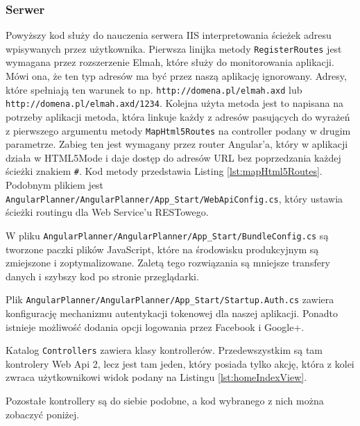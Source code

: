 \documentclass[10pt,titlepage]{article}
\begin{document}
\subsubsection{Serwer}
\lstset{style=sharpc}

\par Powyższy kod służy do nauczenia serwera IIS interpretowania ścieżek adresu wpisywanych przez użytkownika. Pierwsza linijka metody \verb|RegisterRoutes| jest wymagana przez rozszerzenie Elmah, które służy do monitorowania aplikacji. Mówi ona, że ten typ adresów ma być przez naszą aplikację ignorowany. Adresy, które spełniają ten warunek to np. \verb|http://domena.pl/elmah.axd| lub \verb|http://domena.pl/elmah.axd/1234|. Kolejna użyta metoda jest to napisana na potrzeby aplikacji metoda, która linkuje każdy z adresów pasujących do wyrażeń z pierwszego argumentu metody \verb|MapHtml5Routes| na controller podany w drugim parametrze. Zabieg ten jest wymagany przez router Angular'a, który w aplikacji działa w HTML5Mode i daje dostęp do adresów URL bez poprzedzania każdej ścieżki znakiem \verb|#|. Kod metody przedstawia Listing \ref{lst:mapHtml5Routes}. Podobnym plikiem jest \verb|AngularPlanner/AngularPlanner/App_Start/WebApiConfig.cs|, który ustawia ścieżki routingu dla Web Service'u RESTowego.

\par W pliku \verb|AngularPlanner/AngularPlanner/App_Start/BundleConfig.cs| są tworzone paczki plików JavaScript, które na środowisku produkcyjnym są zmiejszone i zoptymalizowane. Zaletą tego rozwiązania są mniejsze transfery danych i szybszy kod po stronie przeglądarki.\par Plik \verb|AngularPlanner/AngularPlanner/App_Start/Startup.Auth.cs| zawiera konfigurację mechanizmu autentykacji tokenowej dla naszej aplikacji. Ponadto istnieje możliwość dodania opcji logowania przez Facebook i Google+.\par Katalog \verb|Controllers| zawiera klasy kontrollerów. Przedewszystkim są tam kontrolery Web Api 2, lecz jest tam jeden, który posiada tylko akcję, która z kolei zwraca użytkownikowi widok podany na Listingu \ref{lst:homeIndexView}.

\par Pozostałe kontrollery są do siebie podobne, a kod wybranego z nich można zobaczyć poniżej.
\end{document}
